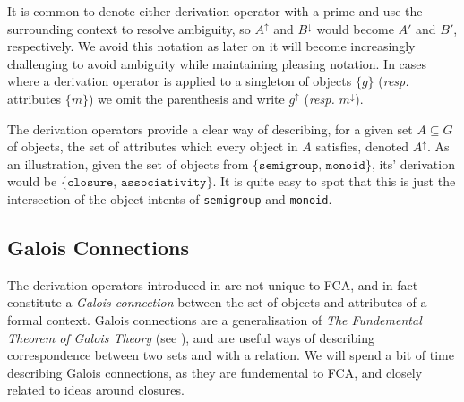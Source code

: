 It is common to denote either derivation operator with a prime and use the surrounding context to resolve ambiguity, so $A^\uparrow$ and $B^\downarrow$ would become $A'$ and $B'$, respectively. We avoid this notation as later on it will become increasingly challenging to avoid ambiguity while maintaining pleasing notation. In cases where a derivation operator is applied to a singleton of objects $\{g\}$ (\textit{resp.} attributes $\{m\}$) we omit the parenthesis and write $g^\uparrow$ (\textit{resp.} $m^\downarrow$).

The derivation operators provide a clear way of describing, for a given set $A\subseteq G$ of objects, the set of attributes which every object in $A$ satisfies, denoted $A^\uparrow$. As an illustration, given the set of objects from  $\{\texttt{semigroup, monoid}\}$, its' derivation would be $\{\texttt{closure, associativity}\}$. It is quite easy to spot that this is just the intersection of the object intents of \texttt{semigroup} and \texttt{monoid}.

\subsection{Galois Connections}
The derivation operators introduced in  are not unique to FCA, and in fact constitute a \textit{Galois connection} between the set of objects and attributes of a formal context. Galois connections are a generalisation of \textit{The Fundemental Theorem of Galois Theory} (see \cite[pp. 205]{bergman2015invitation}), and are useful ways of describing correspondence between two sets and with a relation. We will spend a bit of time describing Galois connections, as they are fundemental to FCA, and closely related to ideas around closures.

